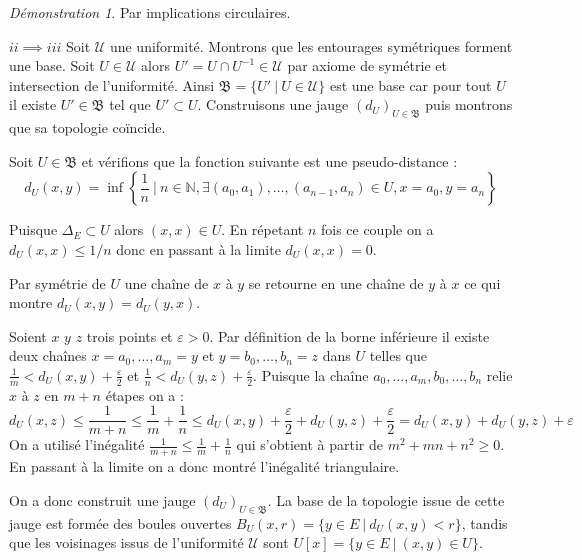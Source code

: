 \documentclass[a4paper, 11pt, french]{book}
\newenvironment{itemise}{\itemize}{\enditemize}
\theoremstyle{plain} %
\theoremstyle{definition} %
\theoremstyle{remark} %
\newtheorem*{demonstration}{Démonstration}
\newcommand{\1}{\mathds{1}}
\newcommand{\N}{\mathbb{N}}
\renewcommand{\frak}[1]{\mathfrak{#1}}
\newcommand{\scr}[1]{\mathscr{#1}}
\newcommand\ens[2]{\{#1 \ |\ #2\}}
\begin{document}
\begin{demonstration}
	Par implications circulaires.
	\begin{itemise}
		\item[$ii\implies iii$] Soit $\scr{U}$ une uniformité.
		Montrons que les entourages symétriques forment une base.
		Soit $U\in\scr{U}$ alors $U'=U\cap U^{-1}\in\scr{U}$ par axiome de symétrie et intersection de l'uniformité.
		Ainsi $\frak{B}=\ens{U'}{U\in\scr{U}}$ est une base car pour tout $U$ il existe $U'\in\frak{B}$ tel que $U'\subset U$.
		Construisons une jauge $(d_U)_{U\in\frak{B}}$ puis montrons que sa topologie coïncide. %
		\begin{itemise}
			\item Soit $U\in\frak{B}$ et vérifions que la fonction suivante est une pseudo-distance :
			$$
			d_U(x, y)=\inf\left\{\frac{1}{n}\ \Big|\ n\in\N, \exists (a_0, a_1), \dots, (a_{n-1}, a_n)\in U, x=a_0, y=a_n\right\}
			$$
			\begin{itemise}
				\item Puisque $\Delta_E\subset U$ alors $(x, x)\in U$.
				En répetant $n$ fois ce couple on a $d_U(x, x)\leqslant 1/n$ donc en passant à la limite $d_U(x, x)=0$.
				\item Par symétrie de $U$ une chaîne de $x$ à $y$ se retourne en une chaîne de $y$ à $x$ ce qui montre $d_U(x, y)=d_U(y, x)$.
				\item Soient $x$ $y$ $z$ trois points et $\varepsilon>0$.
				Par définition de la borne inférieure il existe deux chaînes $x=a_0, \dots, a_m=y$ et $y=b_0, \dots, b_n=z$ dans $U$ telles que $\frac{1}{m}<d_U(x, y)+\frac{\varepsilon}{2}$ et $\frac{1}{n}<d_U(y, z)+\frac{\varepsilon}{2}$.
				Puisque la chaîne $a_0, \dots, a_m, b_0, \dots, b_n$ relie $x$ à $z$ en $m+n$ étapes on a :
				$$
				d_U(x, z)
				\leqslant\frac{1}{m+n}
				\leqslant\frac{1}{m}+\frac{1}{n}
				\leqslant d_U(x, y)+\frac{\varepsilon}{2} + d_U(y, z)+\frac{\varepsilon}{2}
				= d_U(x, y) + d_U(y, z) + \varepsilon
				$$
				On a utilisé l'inégalité $\frac{1}{m+n}\leqslant\frac{1}{m}+\frac{1}{n}$ qui s'obtient à partir de $m^2+mn+n^2\geqslant 0$.
				En passant à la limite on a donc montré l'inégalité triangulaire.
			\end{itemise}
			\item On a donc construit une jauge $(d_U)_{U\in\frak{B}}$.
			La base de la topologie issue de cette jauge est formée des boules ouvertes $B_U(x, r)=\ens{y\in E}{d_U(x, y)<r}$, tandis que les voisinages issus de l'uniformité $\scr{U}$ sont $U[x]=\ens{y\in E}{(x, y)\in U}$.

\end{itemise}
\end{itemise}
\end{demonstration}
\end{document}
